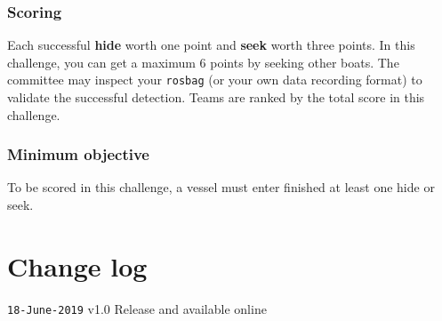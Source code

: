 \documentclass[12pt]{article}
\begin{document}
\subsubsection{Scoring}

Each successful \textbf{hide} worth one point and \textbf{seek} worth three points.
In this challenge, you can get a maximum 6 points by seeking other boats.
The committee may inspect your \texttt{rosbag} (or your own data recording format) to validate the successful detection. 
Teams are ranked by the total score in this challenge.


\subsubsection{Minimum objective}
To be scored in this challenge, a vessel must enter finished at least one hide or seek. 


\section*{Change log}

\texttt{18-June-2019} v1.0 Release and available online
\end{document}
